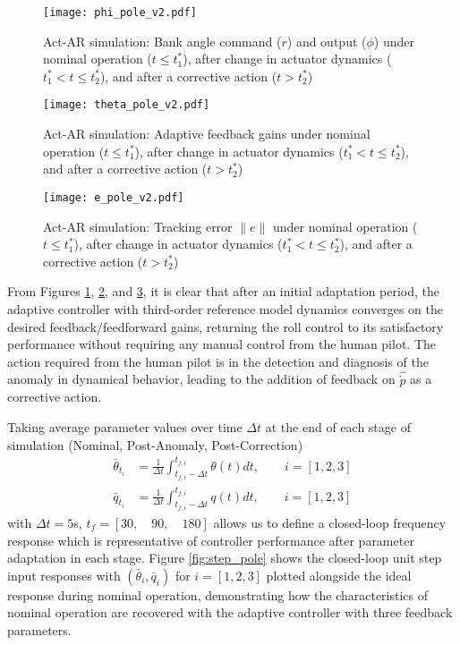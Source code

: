 \begin{figure}[h!]
	\centering
	\texttt{[image: phi\_pole\_v2.pdf]}
	\caption{Act-AR simulation: Bank angle command ($r$) and output ($\phi$) under nominal operation ($t \leq t_1^*$), after change in actuator dynamics ($t_1^* < t \leq t_2^*$), and after a corrective action ($t > t_2^*$)}
	\label{fig:command_and_output}
\end{figure}

\begin{figure}[h!]
	\centering
	\texttt{[image: theta\_pole\_v2.pdf]}
	\caption{Act-AR simulation: Adaptive feedback gains under nominal operation ($t \leq t_1^*$), after change in actuator dynamics ($t_1^* < t \leq t_2^*$), and after a corrective action ($t > t_2^*$)}
	\label{fig:theta}
\end{figure}

\begin{figure}[h!]
	\centering
	\texttt{[image: e\_pole\_v2.pdf]}
	\caption{Act-AR simulation: Tracking error $\|e\|$ under nominal operation ($t \leq t_1^*$), after change in actuator dynamics ($t_1^* < t \leq t_2^*$), and after a corrective action ($t > t_2^*$)}
	\label{fig:error}
\end{figure}

From Figures \ref{fig:command_and_output}, \ref{fig:theta}, and \ref{fig:error}, it is clear that after an initial adaptation period, the adaptive controller with third-order reference model dynamics converges on the desired feedback/feedforward gains, returning the roll control to its satisfactory performance without requiring any manual control from the human pilot. The action required from the human pilot is in the detection and diagnosis of the anomaly in dynamical behavior, leading to the addition of feedback on $\hat{\dot{p}}$ as a corrective action. 

Taking average parameter values over time $\Delta t$ at the end of each stage of simulation (Nominal, Post-Anomaly, Post-Correction)
\begin{align}
	\bar{\theta}_{t_i} &= \frac{1}{\Delta t} \int_{t_{f,i}-\Delta t}^{t_{f,i}} \theta(t) dt, \qquad i = [1, 2, 3] \label{eqn:theta_bar}\\
	\bar{q}_{t_i} &= \frac{1}{\Delta t} \int_{t_{f,i}-\Delta t}^{t_{f,i}} q(t) dt, \qquad i = [1, 2, 3] \label{eqn:q_bar}
\end{align}
with $\Delta t = 5$s, $t_f = [30, \quad 90, \quad 180]$ allows us to define a closed-loop frequency response which is representative of controller performance after parameter adaptation in each stage. Figure \ref{fig:step_pole} shows the closed-loop unit step input responses with $(\bar{\theta}_i, \bar{q}_i)$ for $i = [1, 2, 3]$ plotted alongside the ideal response during nominal operation, demonstrating how the characteristics of nominal operation are recovered with the adaptive controller with three feedback parameters.

